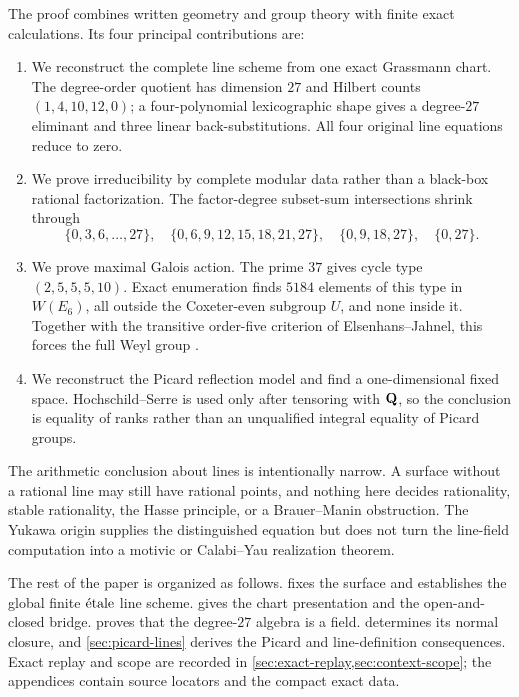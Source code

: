 The proof combines written geometry and group theory with finite exact
calculations.  Its four principal contributions are:
\begin{enumerate}[leftmargin=*]
\item We reconstruct the complete line scheme from one exact Grassmann chart.
The degree-order quotient has dimension \(27\) and Hilbert counts
\((1,4,10,12,0)\); a four-polynomial lexicographic shape gives a
degree-\(27\) eliminant and three linear back-substitutions.  All four
original line equations reduce to zero.
\item We prove irreducibility by complete modular data rather than a
black-box rational factorization.  The factor-degree subset-sum intersections
shrink through
\[
\{0,3,6,\ldots,27\},\quad
\{0,6,9,12,15,18,21,27\},\quad
\{0,9,18,27\},\quad
\{0,27\}.
\]
\item We prove maximal Galois action.  The prime \(37\) gives cycle type
\((2,5,5,5,10)\).  Exact enumeration finds \(5184\) elements of this type in
\(W(E_6)\), all outside the Coxeter-even subgroup \(U\), and none inside it.
Together with the transitive order-five criterion of
Elsenhans--Jahnel, this forces the full Weyl group
\cite{ElsenhansJahnel2009}.
\item We reconstruct the Picard reflection model and find a
one-dimensional fixed space.  Hochschild--Serre is used only after tensoring
with \(\mathbf Q\), so the conclusion is equality of ranks rather than an
unqualified integral equality of Picard groups.
\end{enumerate}

The arithmetic conclusion about lines is intentionally narrow.  A surface
without a rational line may still have rational points, and nothing here
decides rationality, stable rationality, the Hasse principle, or a
Brauer--Manin obstruction.  The Yukawa origin supplies the distinguished
equation but does not turn the line-field computation into a motivic or
Calabi--Yau realization theorem.

The rest of the paper is organized as follows.
 fixes the surface and establishes the global finite
\(\mathrm{\acute{e}tale}\) line scheme.   gives the chart presentation
and the open-and-closed bridge.   proves that the
degree-\(27\) algebra is a field.   determines its
normal closure, and \cref{sec:picard-lines} derives the Picard and
line-definition consequences.  Exact replay and scope are recorded in
\cref{sec:exact-replay,sec:context-scope}; the appendices contain source
locators and the compact exact data.
